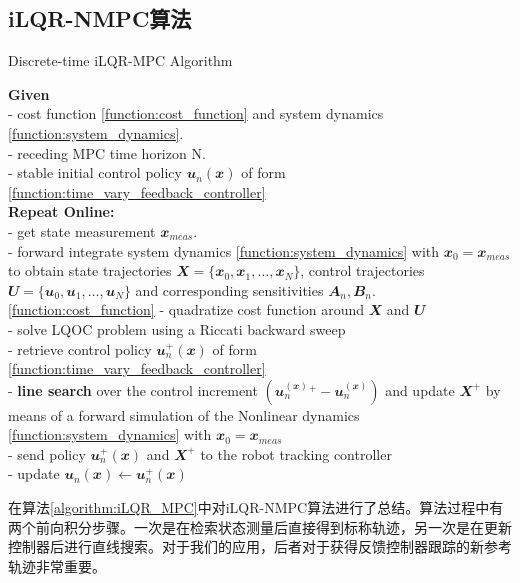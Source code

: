 \subsection[iLQR-NMPC算法]{iLQR-NMPC算法}

\begin{algorithm}
    \caption[short]{Discrete-time iLQR-MPC Algorithm}
    \label{algorithm:iLQR_MPC}
    \textbf{Given}\\
    - cost function \eqref{function:cost_function} and system dynamics \eqref{function:system_dynamics}.\\
    - receding MPC time horizon N.\\
    - stable initial control policy $\mathbfit{u}_n(\mathbfit{x})$ of form \eqref{function:time_vary_feedback_controller}\\
    \textbf{Repeat Online:}\\
    - get state measurement $\mathbfit{x}_{meas}$.\\
    - forward integrate system dynamics \eqref{function:system_dynamics} with $\mathbfit{x}_0=\mathbfit{x}_{meas}$ to obtain state trajectories $\mathbfit{X}=\{\mathbfit{x}_0, \mathbfit{x}_1, \dots, \mathbfit{x}_N\}$, control trajectories $\mathbfit{U}=\{\mathbfit{u}_0, \mathbfit{u}_1, \dots, \mathbfit{u}_N\}$ and corresponding sensitivities $\mathbfit{A}_n, \mathbfit{B}_n$.\\\eqref{function:cost_function}
    - quadratize cost function around $\mathbfit{X}$ and $\mathbfit{U}$\\
    - solve LQOC problem using a Riccati backward sweep\\
    - retrieve control policy $\mathbfit{u}_n^+(\mathbfit{x})$ of form \eqref{function:time_vary_feedback_controller}\\
    - \textbf{line search} over the control increment $(\mathbfit{u}_n^(\mathbfit{x})^+-\mathbfit{u}_n^(\mathbfit{x}))$ and update $\mathbfit{X}^+$ by means of a forward simulation of the Nonlinear dynamics \eqref{function:system_dynamics} with $\mathbfit{x}_0=\mathbfit{x}_{meas}$\\
    - send policy $\mathbfit{u}_n^+(\mathbfit{x})$ and $\mathbfit{X}^+$ to the robot tracking controller\\
    - update $\mathbfit{u}_n(\mathbfit{x})\leftarrow\mathbfit{u}_n^+(\mathbfit{x})$
\end{algorithm}

在算法\ref{algorithm:iLQR_MPC}中对iLQR-NMPC算法进行了总结。算法过程中有两个前向积分步骤。一次是在检索状态测量后直接得到标称轨迹，另一次是在更新控制器后进行直线搜索。对于我们的应用，后者对于获得反馈控制器跟踪的新参考轨迹非常重要。


